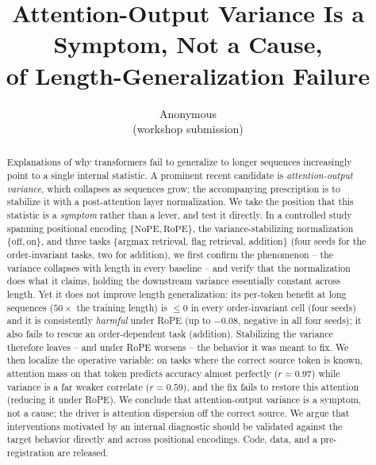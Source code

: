 \documentclass[11pt]{article}
\title{\textbf{Attention-Output Variance Is a Symptom, Not a Cause,\\ of Length-Generalization Failure}}
\author{Anonymous\\ \small(workshop submission)}
\date{}
\begin{document}
\maketitle

\begin{abstract}
Explanations of why transformers fail to generalize to longer sequences increasingly point to a single
internal statistic. A prominent recent candidate is \emph{attention-output variance}, which collapses as
sequences grow; the accompanying prescription is to stabilize it with a post-attention layer
normalization. We take the position that this statistic is a \emph{symptom} rather than a lever, and test
it directly. In a controlled study spanning positional encoding $\{\text{NoPE},\text{RoPE}\}$, the
variance-stabilizing normalization $\{\text{off},\text{on}\}$, and three tasks $\{$argmax retrieval, flag
retrieval, addition$\}$ (four seeds for the order-invariant tasks, two for addition), we first confirm the phenomenon -- the variance collapses with
length in every baseline -- and verify that the normalization does what it claims, holding the
downstream variance essentially constant across length. Yet it does not improve length generalization:
its per-token benefit at long sequences ($50\times$ the training length) is $\le 0$ in every
order-invariant cell (four seeds) and it is consistently \emph{harmful} under RoPE (up to $-0.08$,
negative in all four seeds); it also fails to rescue an order-dependent task (addition).
Stabilizing the variance therefore leaves -- and under RoPE worsens -- the behavior it was meant to fix.
We then localize the operative variable: on tasks where the correct source token is known, attention mass
on that token predicts accuracy almost perfectly ($r=0.97$) while variance is a far weaker correlate
($r=0.59$), and the fix fails to restore this attention (reducing it under RoPE). We conclude that
attention-output variance is a symptom, not a cause; the driver is attention dispersion off the correct
source. We argue that interventions motivated by an internal diagnostic should be validated against the
target behavior directly and across positional encodings. Code, data, and a pre-registration are released.
\end{abstract}
\end{document}
